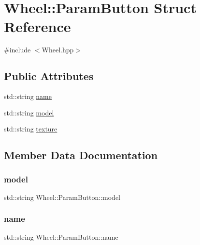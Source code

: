\hypertarget{struct_wheel_1_1_param_button}{}\section{Wheel\+::Param\+Button Struct Reference}
\label{struct_wheel_1_1_param_button}


{\ttfamily \#include $<$Wheel.\+hpp$>$}

\subsection*{Public Attributes}
\begin{DoxyCompactItemize}
\item 
std\+::string \mbox{\hyperlink{struct_wheel_1_1_param_button_aeb0df6af25bb81700b45a3937ec4c14c}{name}}
\item 
std\+::string \mbox{\hyperlink{struct_wheel_1_1_param_button_a524f4077aa32e219e4a1ee2c80cf06bb}{model}}
\item 
std\+::string \mbox{\hyperlink{struct_wheel_1_1_param_button_afc45b6b33c16016d935be2db6a9c1811}{texture}}
\end{DoxyCompactItemize}


\subsection{Member Data Documentation}
\mbox{\label{struct_wheel_1_1_param_button_a524f4077aa32e219e4a1ee2c80cf06bb}} 
\subsubsection{\texorpdfstring{model}{model}}
{\footnotesize\ttfamily std\+::string Wheel\+::\+Param\+Button\+::model}

\mbox{\label{struct_wheel_1_1_param_button_aeb0df6af25bb81700b45a3937ec4c14c}} 
\subsubsection{\texorpdfstring{name}{name}}
{\footnotesize\ttfamily std\+::string Wheel\+::\+Param\+Button\+::name}

